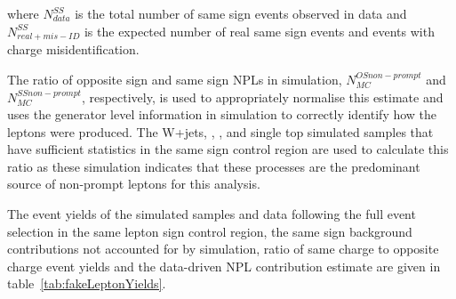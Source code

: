 where $N_{data}^{SS}$ is the total number of same sign events observed in data and $N^{SS}_{real + mis-ID}$ is the expected number of real same sign events and events with charge misidentification.

The ratio of opposite sign and same sign NPLs in simulation, $N_{MC}^{OS non-prompt}$ and $N_{MC}^{SS non-prompt}$, respectively, is used to appropriately normalise this estimate and uses the generator level information in simulation to correctly identify how the leptons were produced.
The W+jets, \ttZ, \ttW, and single top simulated samples that have sufficient statistics in the same sign control region are used to calculate this ratio as these simulation indicates that these processes are the predominant source of non-prompt leptons for this analysis.

The event yields of the simulated samples and data following the full event selection in the same lepton sign control region, the same sign background contributions not accounted for by simulation, ratio of same charge to opposite charge event yields and the data-driven NPL contribution estimate are given in table~\ref{tab:fakeLeptonYields}.


